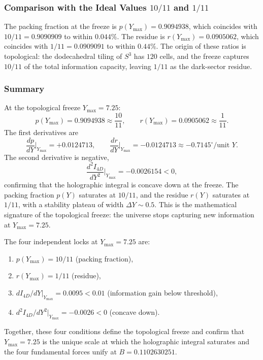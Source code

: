 \documentclass[12pt,oneside,openany]{book}
\begin{document}
\subsubsection{Comparison with the Ideal Values $10/11$ and $1/11$}

The packing fraction at the freeze is $p(Y_{\max}) = 0.9094938$, which coincides with $10/11 = 0.9090909$ to within $0.044\%$. The residue is $r(Y_{\max}) = 0.0905062$, which coincides with $1/11 = 0.0909091$ to within $0.44\%$. The origin of these ratios is topological: the dodecahedral tiling of $S^3$ has $120$ cells, and the freeze captures $10/11$ of the total information capacity, leaving $1/11$ as the dark-sector residue.

\subsubsection{Summary}

At the topological freeze $Y_{\max} = 7.25$:
\begin{equation}
\boxed{p(Y_{\max}) = 0.9094938 \approx \frac{10}{11}, \qquad r(Y_{\max}) = 0.0905062 \approx \frac{1}{11}.}
\label{eq:p-r-summary}
\end{equation}
The first derivatives are
\begin{equation}
\boxed{\frac{dp}{dY}\bigg|_{Y_{\max}} = +0.0124713, \qquad \frac{dr}{dY}\bigg|_{Y_{\max}} = -0.0124713 \approx -0.7145^\circ/\text{unit } Y.}
\label{eq:derivative-summary}
\end{equation}
The second derivative is negative,
\begin{equation}
\boxed{\frac{d^2I_{4D}}{dY^2}\bigg|_{Y_{\max}} = -0.0026154 < 0,}
\label{eq:concavity-summary}
\end{equation}
confirming that the holographic integral is concave down at the freeze. The packing fraction $p(Y)$ saturates at $10/11$, and the residue $r(Y)$ saturates at $1/11$, with a stability plateau of width $\Delta Y \sim 0.5$. This is the mathematical signature of the topological freeze: the universe stops capturing new information at $Y_{\max} = 7.25$.

The four independent locks at $Y_{\max} = 7.25$ are:
\begin{enumerate}
\item $p(Y_{\max}) = 10/11$ (packing fraction),
\item $r(Y_{\max}) = 1/11$ (residue),
\item $dI_{4D}/dY|_{Y_{\max}} = 0.0095 < 0.01$ (information gain below threshold),
\item $d^2I_{4D}/dY^2|_{Y_{\max}} = -0.0026 < 0$ (concave down).
\end{enumerate}
Together, these four conditions define the topological freeze and confirm that $Y_{\max} = 7.25$ is the unique scale at which the holographic integral saturates and the four fundamental forces unify at $B = 0.1102630251$.
\end{document}
